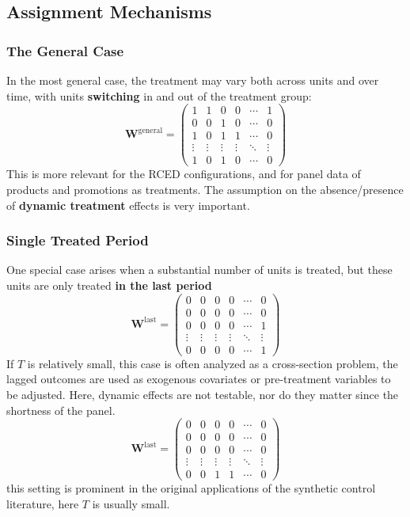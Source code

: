 \documentclass[twoside]{article}
\begin{document}
\subsection{Assignment Mechanisms}
\subsubsection{The General Case}
In the most general case, the treatment may vary both across units and over time, with units \textbf{switching} in and out of the treatment group:
\begin{equation*}
    \mathbf{W}^{\text{general}} = \begin{pmatrix}
        1&1&0&0&\cdots &1\\
        0&0&1&0&\cdots &0\\
        1&0&1&1&\cdots &0\\
        \vdots &\vdots & \vdots & \vdots & \ddots & \vdots \\
        1&0&1&0&\cdots &0
    \end{pmatrix}
\end{equation*}
This is more relevant for the RCED configurations, and for panel data of products and promotions as treatments.
The assumption on the absence/presence of \textbf{dynamic treatment} effects is very important.

\subsubsection{Single Treated Period}
One special case arises when a substantial number of units is treated, but these units are only treated \textbf{in the last period}
\begin{equation*}
    \mathbf{W}^{\text{last}} = \begin{pmatrix}
        0&0&0&0&\cdots &0\\
        0&0&0&0&\cdots &0\\
        0&0&0&0&\cdots &1\\
        \vdots &\vdots & \vdots & \vdots & \ddots & \vdots \\
        0&0&0&0&\cdots &1
    \end{pmatrix}
\end{equation*}
If $T$ is relatively small, this case is often analyzed as a cross-section problem, the lagged outcomes are used as exogenous covariates or pre-treatment variables to be adjusted.
Here, dynamic effects are not testable, nor do they matter since the shortness of the panel.
\begin{equation*}
    \mathbf{W}^{\text{last}} = \begin{pmatrix}
        0&0&0&0&\cdots &0\\
        0&0&0&0&\cdots &0\\
        0&0&0&0&\cdots &0\\
        \vdots &\vdots & \vdots & \vdots & \ddots & \vdots \\
        0&0&1&1&\cdots &0
    \end{pmatrix}
\end{equation*}
this setting is prominent in the original applications of the synthetic control literature, here $T$ is usually small.
\end{document}
